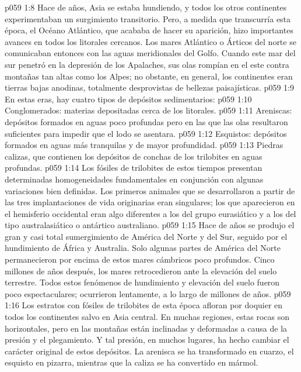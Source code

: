 \vs p059 1:8 \pc Hace  de años, Asia se estaba hundiendo, y todos los otros continentes experimentaban un surgimiento transitorio. Pero, a medida que transcurría esta época, el Océano Atlántico, que acababa de hacer su aparición, hizo importantes avances en todos los litorales cercanos. Los mares Atlántico o Árticos del norte se comunicaban entonces con las aguas meridionales del Golfo. Cuando este mar del sur penetró en la depresión de los Apalaches, sus olas rompían en el este contra montañas tan altas como los Alpes; no obstante, en general, los continentes eran tierras bajas anodinas, totalmente desprovistas de bellezas paisajísticas.
\vs p059 1:9 \pc En estas eras, hay cuatro tipos de depósitos sedimentarios:
\vs p059 1:10 Conglomerados: materias depositadas cerca de los litorales.
\vs p059 1:11 Areniscas: depósitos formados en aguas poco profundas pero en las que las olas resultaron suficientes para impedir que el lodo se asentara.
\vs p059 1:12 Esquistos: depósitos formados en aguas más tranquilas y de mayor profundidad.
\vs p059 1:13 Piedras calizas, que contienen los depósitos de conchas de los trilobites en aguas profundas.
\vs p059 1:14 \pc Los fósiles de trilobites de estos tiempos presentan determinadas homogeneidades fundamentales en conjunción con algunas variaciones bien definidas. Los primeros animales que se desarrollaron a partir de las tres implantaciones de vida originarias eran singulares; los que aparecieron en el hemisferio occidental eran algo diferentes a los del grupo eurasiático y a los del tipo australasiático o antártico australiano.
\vs p059 1:15 \pc Hace  de años se produjo el gran y casi total sumergimiento de América del Norte y del Sur, seguido por el hundimiento de África y Australia. Solo algunas partes de América del Norte permanecieron por encima de estos mares cámbricos poco profundos. Cinco millones de años después, los mares retrocedieron ante la elevación del suelo terrestre. Todos estos fenómenos de hundimiento y elevación del suelo fueron poco espectaculares; ocurrieron lentamente, a lo largo de millones de años.
\vs p059 1:16 Los estratos con fósiles de trilobites de esta época afloran por doquier en todos los continentes salvo en Asia central. En muchas regiones, estas rocas son horizontales, pero en las montañas están inclinadas y deformadas a causa de la presión y el plegamiento. Y tal presión, en muchos lugares, ha hecho cambiar el carácter original de estos depósitos. La arenisca se ha transformado en cuarzo, el esquisto en pizarra, mientras que la caliza se ha convertido en mármol.
